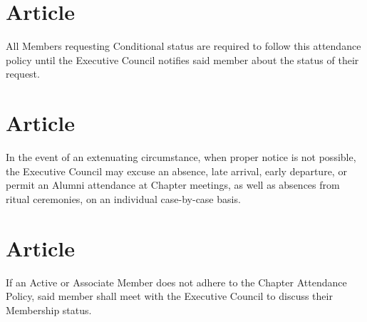 \documentclass[11pt]{article}
\newcommand{\article}{\section{Article}}
\begin{document}
\article
  All Members requesting Conditional status are required to follow this attendance policy until the Executive Council notifies said member about the status of their request.

\article
  In the event of an extenuating circumstance, when proper notice is not possible, the Executive Council may excuse an absence, late arrival, early departure, or permit an Alumni attendance at Chapter meetings, as well as absences from ritual ceremonies, on an individual case-by-case basis.

\article
  If an Active or Associate Member does not adhere to the Chapter Attendance Policy, said member shall meet with the Executive Council to discuss their Membership status.
\end{document}

